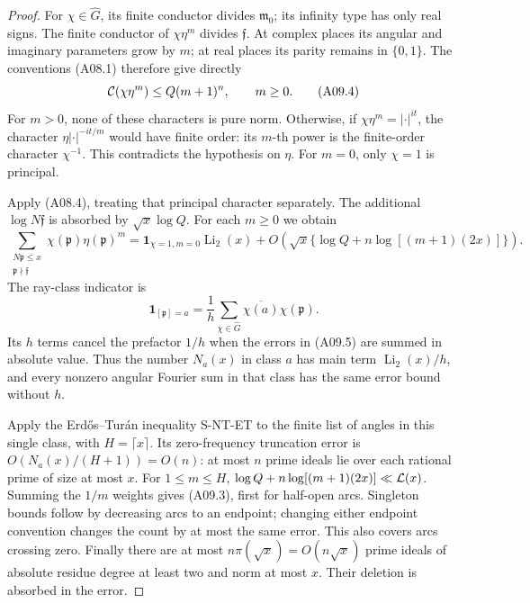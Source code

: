 \begin{proof}
For \(\chi\in\widehat G\), its finite conductor divides
\(\mathfrak m_0\); its infinity type has only real signs.
The finite conductor of \(\chi\eta^m\) divides \(\mathfrak f\).
At complex places its angular and imaginary parameters grow
by \(m\); at real places its parity remains in \(\{0,1\}\).
The conventions (A08.1) therefore give directly
\[
 {\cal C}(\chi\eta^m)\le Q(m+1)^n,\qquad m\ge0.           \tag{A09.4}
\]
For \(m>0\), none of these characters is pure norm. Otherwise,
if \(\chi\eta^m=|\cdot|^{it}\), the character
\(\eta|\cdot|^{-it/m}\) would have finite order: its \(m\)-th
power is the finite-order character \(\chi^{-1}\).
This contradicts the hypothesis on \(\eta\).
For \(m=0\), only \(\chi=1\) is principal.

Apply (A08.4), treating that principal character separately.
The additional \(\log N\mathfrak f\) is absorbed by
\(\sqrt x\log Q\). For each \(m\ge0\) we obtain
\[
 \sum_{\substack{N\mathfrak p\le x\\\mathfrak p\nmid\mathfrak f}}
       \chi(\mathfrak p)\eta(\mathfrak p)^m
 =\mathbf1_{\chi=1,m=0}\operatorname{Li}_2(x)
 +O\left(\sqrt x\{\log Q+n\log[(m+1)(2x)]\}\right).
                                                               \tag{A09.5}
\]
The ray-class indicator is
\[
 \mathbf1_{[\mathfrak p]=a}
       =\frac1h\sum_{\chi\in\widehat G}
                        \overline{\chi(a)}\chi(\mathfrak p).
 \]
Its \(h\) terms cancel the prefactor \(1/h\) when the errors
in (A09.5) are summed in absolute value. Thus the number
\(N_a(x)\) in class \(a\) has main term \(\operatorname{Li}_2(x)/h\),
and every nonzero angular Fourier sum in that class has
the same error bound without \(h\).

Apply the Erd\H{o}s--Tur\'an inequality S-NT-ET to the finite
list of angles in this single class, with \(H=\lceil x\rceil\).
Its zero-frequency truncation error is
\(O(N_a(x)/(H+1))=O(n)\): at most \(n\) prime ideals lie over
each rational prime of size at most \(x\).
For \(1\le m\le H\),
\(\log Q+n\log[(m+1)(2x)]\ll{\cal L}(x)\).
Summing the \(1/m\) weights gives (A09.3), first for half-open
arcs. Singleton bounds follow by decreasing arcs to an endpoint;
changing either endpoint convention changes the count by at
most the same error. This also covers arcs crossing zero.
Finally there are at most \(n\pi(\sqrt x)=O(n\sqrt x)\)
prime ideals of absolute residue degree at least two and norm
at most \(x\). Their deletion is absorbed in the error.
\end{proof}

